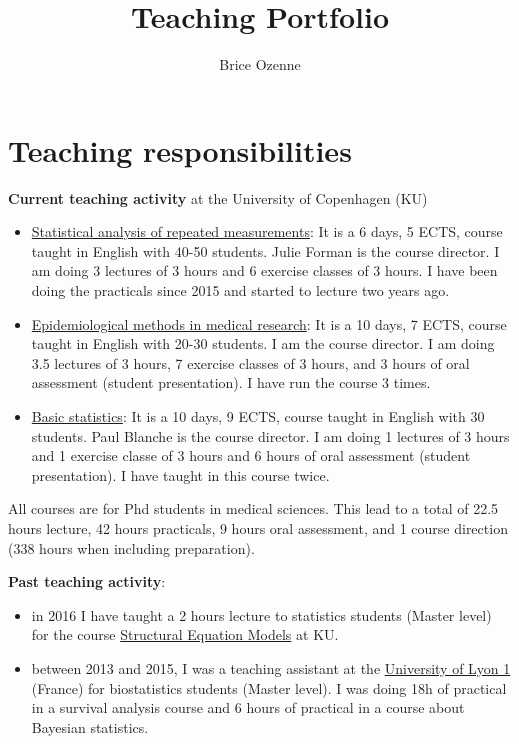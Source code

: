 \documentclass[12pt]{article}
\author{Brice Ozenne}
\date{}
\title{Teaching Portfolio}
\begin{document}
\maketitle

\section{Teaching responsibilities}
\label{sec:org535d7f6}

\textbf{Current teaching activity} at the University of Copenhagen (KU) 
\begin{itemize}
\item \href{https://absalon.ku.dk/courses/47665}{Statistical analysis of repeated measurements}: It is a 6
days, 5 ECTS, course taught in English with 40-50 students. Julie
Forman is the course director. \newline I am doing 3 lectures of 3
hours and 6 exercise classes of 3 hours. I have been doing the
practicals since 2015 and started to lecture two years ago.
\item \href{https://absalon.ku.dk/courses/58764}{Epidemiological methods in medical research}: It is a 10
days, 7 ECTS, course taught in English with 20-30 students. I am the
course director. \newline I am doing 3.5 lectures of 3 hours, 7
exercise classes of 3 hours, and 3 hours of oral assessment (student
presentation). I have run the course 3 times.
\item \href{http://paulblanche.com/files/BasicStat2023.html}{Basic statistics}: It is a 10 days, 9 ECTS, course taught in
English with 30 students. Paul Blanche is the course
director. \newline I am doing 1 lectures of 3 hours and 1 exercise
classe of 3 hours and 6 hours of oral assessment (student
presentation). I have taught in this course twice.
\end{itemize}

All courses are for Phd students in medical sciences. This lead to a
total of 22.5 hours lecture, 42 hours practicals, 9 hours oral
assessment, and 1 course direction (338 hours when including
preparation).

\bigskip

\noindent \textbf{Past teaching activity}:
\begin{itemize}
\item in 2016 I have taught a 2 hours lecture to statistics students
(Master level) for the course \href{https://absalon.instructure.com/courses/2385}{Structural Equation Models} at KU.
\item between 2013 and 2015, I was a teaching assistant at the
\href{https://mastersantepublique.univ-lyon1.fr/icap\_website/299/5382}{University
of Lyon 1} (France) for biostatistics students (Master level). I
was doing 18h of practical in a survival analysis course and 6 hours
of practical in a course about Bayesian statistics.
\end{itemize}
\end{document}

